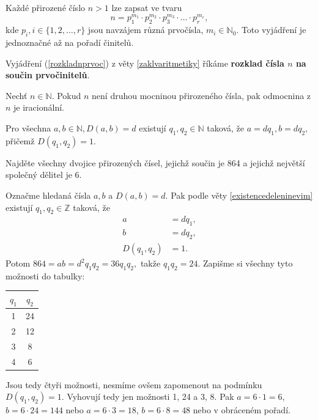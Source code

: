 \begin{veta}\label{zaklvaritmetiky}
  Každé přirozené číslo $n>1$ lze zapsat ve tvaru
  \begin{equation}\label{rozkladnprvoc}
	n=p_1^{m_1}\cdot p_2^{m_2} \cdot p_3^{m_3}\cdot \hdots \cdot p_r^{m_r},
  \end{equation}
  kde $p_i,i\in\{ 1, 2, \dots, r \}$ jsou navzájem různá prvočísla, $m_i\in \mathbb N_0$. Toto vyjádření je jednoznačné
  až na pořadí činitelů.
\end{veta}

\begin{definition}
	Vyjádření (\ref{rozkladnprvoc}) z věty \ref{zaklvaritmetiky} říkáme
	\textbf{rozklad čísla $n$ na součin prvočinitelů}.
\end{definition}

\begin{veta}
  Nechť $n\in \mathbb N.$ Pokud $n$ není druhou mocninou přirozeného čísla, pak odmocnina z $n$ je iracionální.
\end{veta}

\begin{veta}\label{existencedeleninevim}
    Pro všechna $a,b \in \mathbb N, D(a,b)=d$ existují $q_1, q_2\in \mathbb N$ taková,
    že $a=dq_1, b=dq_2, $ přičemž $D(q_1, q_2)=1.$
\end{veta}

\begin{priklad}
Najděte všechny dvojice přirozených čísel, jejichž součin je 864 a jejichž největší společný dělitel je 6.
\end{priklad}

\begin{reseni}
Označme hledaná čísla $a,b$ a $D(a,b)=d$. Pak podle věty \ref{existencedeleninevim} existují $q_1, q_2 \in \mathbb Z$ taková, že
\begin{align*}
	a &= dq_1,\\
	b &= dq_2, \\
	D(q_1,q_2) &= 1.
\end{align*}
Potom $864=ab=d^2q_1q_2=36q_1q_2,$ takže $q_1q_2=24$. Zapišme si všechny tyto možnosti do tabulky:
\begin{center}
	\begin{tabular}{c | c }
	    $q_1$ & $q_2$ \\
		\hline
	    1 & 24 \\
		2 & 12 \\
		3 & 8 \\
		4 & 6
	\end{tabular}
\end{center}
Jsou tedy čtyři možnosti, nesmíme ovšem zapomenout na podmínku $D(q_1,q_2)=1$. Vyhovují tedy jen možnosti
1, 24 a 3, 8. Pak $a=6\cdot 1=6$, $b=6\cdot 24=144$ nebo $a=6\cdot 3=18$, $b=6\cdot 8=48$ nebo v obráceném pořadí.
\end{reseni}

